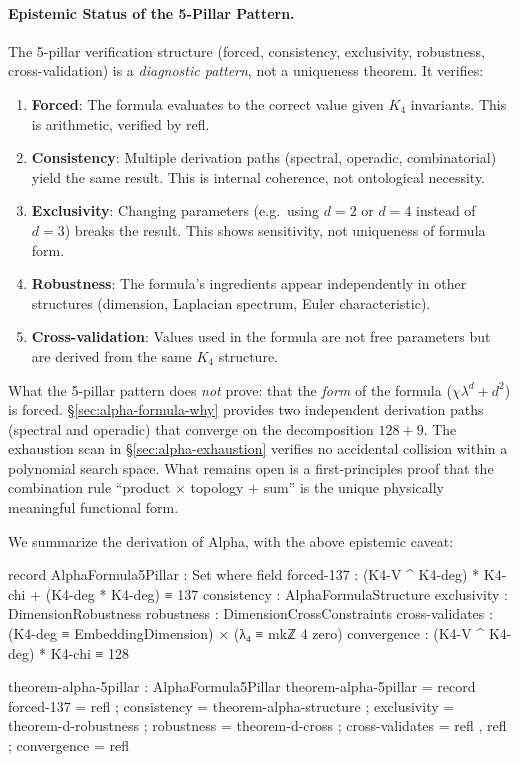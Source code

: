 \documentclass[11pt,a4paper]{book}
\def\texttt#1{#1}%
\begin{document}
\paragraph{Epistemic Status of the 5-Pillar Pattern.}
The 5-pillar verification structure (forced, consistency, exclusivity, robustness,
cross-validation) is a \emph{diagnostic pattern}, not a uniqueness theorem. It verifies:
\begin{enumerate}
\item \textbf{Forced}: The formula evaluates to the correct value given $K_4$ invariants.
  This is arithmetic, verified by \texttt{refl}.
\item \textbf{Consistency}: Multiple derivation paths (spectral, operadic, combinatorial)
  yield the same result. This is internal coherence, not ontological necessity.
\item \textbf{Exclusivity}: Changing parameters (e.g.\ using $d=2$ or $d=4$ instead of $d=3$)
  breaks the result. This shows sensitivity, not uniqueness of formula form.
\item \textbf{Robustness}: The formula's ingredients appear independently in other structures
  (dimension, Laplacian spectrum, Euler characteristic).
\item \textbf{Cross-validation}: Values used in the formula are not free parameters but are
  derived from the same $K_4$ structure.
\end{enumerate}
What the 5-pillar pattern does \emph{not} prove: that the \emph{form} of the formula
($\chi\lambda^d + d^2$) is forced. \S\ref{sec:alpha-formula-why} provides two independent
derivation paths (spectral and operadic) that converge on the decomposition $128 + 9$.
The exhaustion scan in \S\ref{sec:alpha-exhaustion} verifies no accidental collision
within a polynomial search space. What remains open is a first-principles proof
that the combination rule ``product $\times$ topology $+$ sum'' is the unique
physically meaningful functional form.

We summarize the derivation of Alpha, with the above epistemic caveat:

\begin{code}
record AlphaFormula5Pillar : Set where
  field
    forced-137 : (K4-V ^ K4-deg) * K4-chi + (K4-deg * K4-deg) ≡ 137
    consistency     : AlphaFormulaStructure
    exclusivity     : DimensionRobustness
    robustness      : DimensionCrossConstraints
    cross-validates : (K4-deg ≡ EmbeddingDimension) × (λ₄ ≡ mkℤ 4 zero)
    convergence     : (K4-V ^ K4-deg) * K4-chi ≡ 128

theorem-alpha-5pillar : AlphaFormula5Pillar
theorem-alpha-5pillar = record
  { forced-137      = refl
  ; consistency     = theorem-alpha-structure
  ; exclusivity     = theorem-d-robustness
  ; robustness      = theorem-d-cross
  ; cross-validates = refl , refl
  ; convergence     = refl
  }
\end{code}
\end{document}
